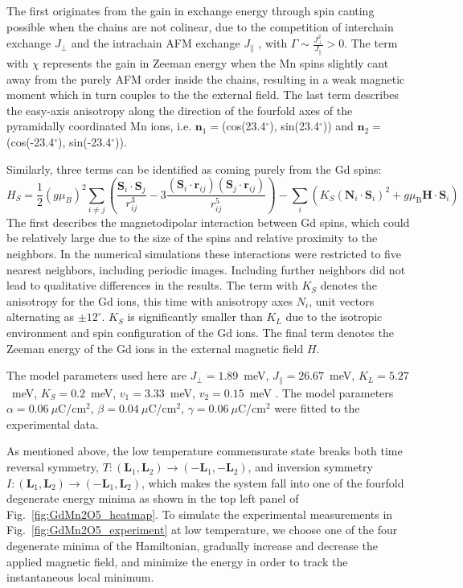The first originates from the gain in exchange energy through spin canting possible when the chains are not colinear, due to the competition of interchain exchange $J_\perp$ and the intrachain AFM exchange $J_\|$ \cite{Sushkov2008} , with $\Gamma\sim\frac{J_{\perp}^2}{J_\|}>0$. The term with $\chi$ represents the gain in Zeeman energy when the Mn spins slightly cant away from the purely AFM order inside the chains, resulting in a weak magnetic moment which in turn couples to the the external field. The last term describes the easy-axis anisotropy along the direction of the fourfold axes of the pyramidally coordinated Mn ions, i.e. $\mathbf{n}_1=$(cos(23.4$^\circ$), sin(23.4$^\circ$)) and $\mathbf{n}_2=$(cos(-23.4$^\circ$), sin(-23.4$^\circ$)).

Similarly, three terms can be identified as coming purely from the Gd spins:
\begin{equation}
     H_S=\frac{1}{2}(g \mu_B)^2\sum_{i\neq j}\left(\frac{\mathbf{S}_i\cdot \mathbf{S}_j}{r_{ij}^3}-3\frac{(\mathbf{S}_i\cdot \mathbf{r}_{ij})(\mathbf{S}_j\cdot \mathbf{r}_{ij})}{r_{ij}^5}\right) - \sum_i\left( K_S(\mathbf{N}_i\cdot \mathbf{S}_i)^2 + g\mu_\mathrm{B} \mathbf{H} \cdot \mathbf{S}_i\right) 
\end{equation}
The first describes the magnetodipolar interaction between Gd spins, which could be relatively large due to the size of the spins and relative proximity to the neighbors. In the numerical simulations these interactions were restricted to five nearest neighbors, including periodic images. Including further neighbors did not lead to qualitative differences in the results. The term with $K_S$ denotes the anisotropy for the Gd ions, this time with anisotropy axes $N_i$, unit vectors alternating as $\pm 12^\circ$. $K_S$ is significantly smaller than $K_L$ due to the isotropic environment and spin configuration of the Gd ions.
The final term denotes the Zeeman energy of the Gd ions in the external magnetic field $H$.

The model parameters used here are $J_\perp = 1.89$~meV, $J_\parallel = 26.67$~meV, $K_L = 5.27$~meV, $K_S = 0.2$~meV, $v_1 = 3.33$~meV, $v_2 = 0.15$~meV . 
The model parameters $\alpha = 0.06\:\mu$C/cm$^2$, $\beta = 0.04\:\mu$C/cm$^2$, $\gamma = 0.06\:\mu$C/cm$^2$ were fitted to the experimental data.

As mentioned above, the low temperature commensurate state breaks both time reversal symmetry, $T: (\mathbf{L}_1, \mathbf{L}_2) \rightarrow (-\mathbf{L}_1, -\mathbf{L}_2)$, and inversion symmetry $I:(\mathbf{L}_1, \mathbf{L}_2) \rightarrow (-\mathbf{L}_1, \mathbf{L}_2)$, which makes the system fall into one of the fourfold degenerate energy minima as shown in the top left panel of Fig.~\ref{fig:GdMn2O5_heatmap}. 
To simulate the experimental measurements in Fig.~\ref{fig:GdMn2O5_experiment} at low temperature, we choose one of the four degenerate minima of the Hamiltonian, gradually increase and decrease the applied magnetic field, and minimize the energy in order to track the instantaneous local minimum. 

